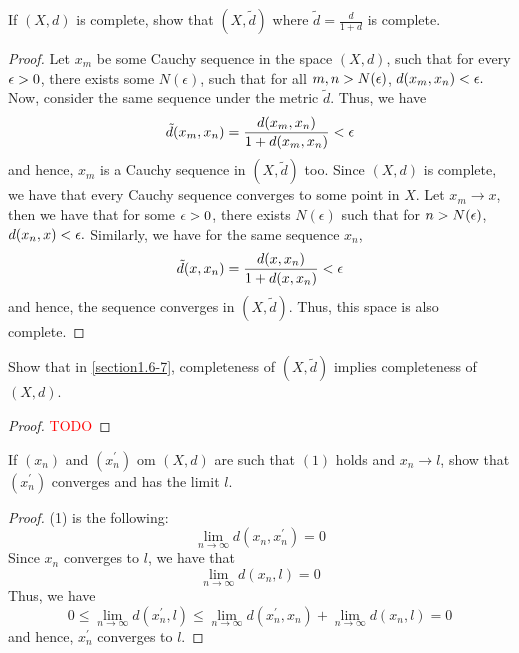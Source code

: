 \begin{question}
    If $(X,d)$ is complete, show that $(X, \tilde{d})$ where $\tilde{d} = \frac{d}{1+d}$ is complete.
    \label{section1.6-7}
\end{question}
\begin{proof}
    Let $x_m$ be some Cauchy sequence in the space $(X,d)$, such that for every $\epsilon > 0$, there exists some $N(\epsilon)$, such that for all $m , n > N(\epsilon)$, $d(x_m  ,x_n) < \epsilon.$ Now, consider the same sequence under the metric $\tilde{d}$. Thus, we have
    \[\tilde{d}(x_m , x_n) = \frac{d(x_m,x_n)}{1 + d(x_m , x_n)} < \epsilon\]
    and hence, $x_m$ is a Cauchy sequence in $(X,\tilde{d})$ too. Since $(X,d)$ is complete, we have that every Cauchy sequence converges to some point in $X$. Let $x_m \rightarrow x$, then we have that for some $\epsilon > 0$, there exists $N(\epsilon)$ such that for $n > N(\epsilon)$, $d(x_n,x) < \epsilon.$ Similarly, we have for the same sequence $x_n$, 
    \[\tilde{d}(x , x_n) = \frac{d(x,x_n)}{1 + d(x , x_n)} < \epsilon\]
    and hence, the sequence converges in $(X,\tilde{d})$. Thus, this space is also complete.
\end{proof}

\begin{question}
    Show that in \ref{section1.6-7}, completeness of $(X,\tilde{d})$ implies completeness of $(X,d)$.
    \label{section1.6-8}
\end{question}
\begin{proof}
    \textcolor{red}{TODO}
\end{proof}

\begin{question}
    If $(x_n)$ and $(x_n^\prime)$ om $(X,d)$  are such that $(1)$ holds and $x_n \rightarrow l$, show that $(x_n^\prime)$ converges and has the limit $l$.
    \label{section1.6-9}
\end{question}
\begin{proof}
    (1) is the following: 
    \[\lim_{n \rightarrow \infty} d(x_n,x_n^\prime) = 0\]
    Since $x_n$ converges to $l$, we have that
    \[\lim_{n \rightarrow \infty} d(x_n,l) = 0\]
    Thus, we have
    \[0 \leq \lim_{n \rightarrow \infty} d(x_n^\prime , l) \leq \lim_{n \rightarrow \infty} d(x_n^\prime , x_n) + \lim_{n \rightarrow \infty} d(x_n , l) = 0\]
    and hence, $x_n^\prime$ converges to $l$.
\end{proof}

